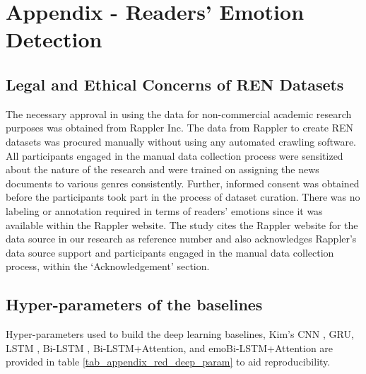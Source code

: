 \chapter{Appendix - Readers' Emotion Detection}
\label{appendix_red}

\section{Legal and Ethical Concerns of REN Datasets} %
\label{appendix_red_concerns}

The necessary approval in using the data for non-commercial academic research purposes was obtained from Rappler Inc. The data from Rappler to create REN datasets was procured manually without using any automated crawling software. All participants engaged in the manual data collection process were sensitized about the nature of the research and were trained on assigning the news documents to various genres consistently. Further, informed consent was obtained before the participants took part in the process of dataset curation. There was no labeling or annotation required in terms of readers' emotions since it was available within the Rappler website. The study cites the Rappler website for the data source in our research as reference number \cite{rappler2022philippine} and also acknowledges Rappler's data source support and participants engaged in the manual data collection process, within the `Acknowledgement' section.

\newpage

\section{Hyper-parameters of the baselines} %
\label{appendix_red_hyper_param}

Hyper-parameters used to build the deep learning baselines, Kim’s CNN \cite{kim2014convolutional}, GRU, LSTM \cite{krebs2017social}, Bi-LSTM \cite{kratzwald2018deep}, Bi-LSTM+Attention, and emoBi-LSTM+Attention are provided in table \ref{tab_appendix_red_deep_param} to aid reproducibility.

